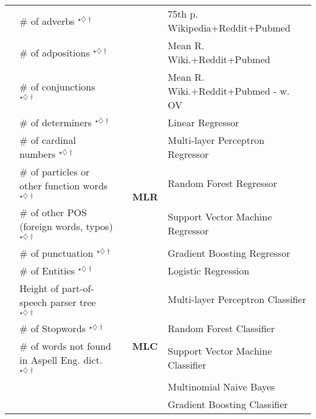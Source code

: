 \begin{table}[tb]
{\begin{tabular}{llcll}
 & \# of adverbs $^{\star\diamondsuit\dagger}$  &  &  & 75th p. Wikipedia+Reddit+Pubmed \tabularnewline
 & \# of adpositions $^{\star\diamondsuit\dagger}$  &  &  & Mean R. Wiki.+Reddit+Pubmed \tabularnewline
 & \# of conjunctions $^{\star\diamondsuit\dagger}$  &  &  & Mean R. Wiki.+Reddit+Pubmed - w. OV \tabularnewline
\cline{4-5}
 & \# of determiners $^{\star\diamondsuit\dagger}$  &  & \multirow{6}{*}{\textbf{MLR}}  & Linear Regressor\tabularnewline
 & \# of cardinal numbers $^{\star\diamondsuit\dagger}$  &  &  & Multi-layer Perceptron Regressor\tabularnewline
 & \# of particles or other function words $^{\star\diamondsuit\dagger}$  &  &  & Random Forest Regressor\tabularnewline
 & \# of other POS (foreign words, typos) $^{\star\diamondsuit\dagger}$  &  &  & Support Vector Machine Regressor\tabularnewline
 & \# of punctuation $^{\star\diamondsuit\dagger}$  &  &  & Gradient Boosting Regressor\tabularnewline
 & \# of Entities $^{\star\diamondsuit\dagger}$  &  &  & Logistic Regression\tabularnewline
\cline{4-5}
 & Height of part-of-speech parser tree $^{\star\diamondsuit\dagger}$  &  & \multirow{5}{*}{\textbf{MLC}}  & Multi-layer Perceptron Classifier\tabularnewline
 & \# of Stopwords $^{\star\diamondsuit\dagger}$  &  &  & Random Forest Classifier\tabularnewline
 & \# of words not found in Aspell Eng. dict. $^{\star\diamondsuit\dagger}$  &  &  & Support Vector Machine Classifier\tabularnewline
 &  &  &  & Multinomial Naive Bayes\tabularnewline
 &  &  &  & Gradient Boosting Classifier\tabularnewline
\hline 
\end{tabular}} \vspace{-12pt}
 
\end{table}
